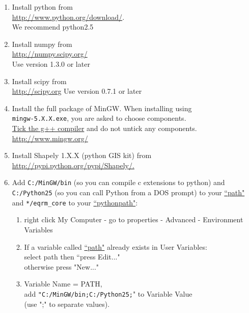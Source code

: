 \documentclass[a4paper, 12pt]{article}
\begin{document}
\begin{enumerate}

\item Install python from \\
\url{http://www.python.org/download/}. \\
We recommend python2.5

\item Install numpy from \\
  \url{http://numpy.scipy.org/} \\
  Use version 1.3.0 or later \\

\item Install scipy from \\
 \url{http://scipy.org}
 Use version 0.7.1 or later \\

\item Install the full package of MinGW.
When installing using \\
\texttt{mingw-5.X.X.exe}, you are
asked to choose components.  \\
\underline{Tick the g++ compiler} and do not untick any components. \\
 \url{http://www.mingw.org/}

\item Install Shapely 1.X.X (python GIS kit) from \\
\url{http://pypi.python.org/pypi/Shapely/.}

\item Add \texttt{C:/MinGW/bin} (so you can compile c extensions
to python) and \texttt{C:/Python25} (so you can call Python from a
DOS prompt) to your \underline{``path"} and \texttt{*/eqrm\_core} to
your \underline{``pythonpath"}:
\begin{enumerate}

\item right click My Computer - go to properties - Advanced - Environment Variables

\item If a variable called \underline{``path"} already exists in User
Variables: \\
select path then ``press Edit..." \\
otherwise press "New..." \\

\item Variable Name = PATH, \\
add \texttt{"C:/MinGW/bin;C:/Python25;}" to  Variable Value \\
(use ";" to separate values).


\end{enumerate}
\end{enumerate}
\end{document}

